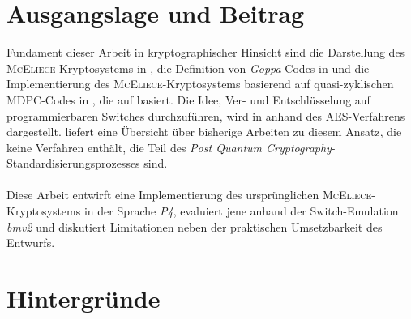 \documentclass[utf8, biblatex]{lni}
\begin{document}
\section{Ausgangslage und Beitrag}
Fundament dieser Arbeit in kryptographischer Hinsicht sind die Darstellung des \textsc{McEliece}-Kryptosystems in \cite{McEliece1978}, die Definition von \textit{Goppa}-Codes in \cite{Berlekamp1973} und die Implementierung des \textsc{McEliece}-Kryptosystems basierend auf quasi-zyklischen MDPC-Codes in \cite{Maurich2015}, die auf \cite{Misoczki2013} basiert. Die Idee, Ver- und Entschlüsselung auf programmierbaren Switches durchzuführen, wird in \cite{Chen2020} anhand des AES-Verfahrens dargestellt. \cite{AlSabeh2022} liefert eine Übersicht über bisherige Arbeiten zu diesem Ansatz, die keine Verfahren enthält, die Teil des \textit{Post Quantum Cryptography}-Standardisierungsprozesses sind. \\\\
Diese Arbeit entwirft eine Implementierung des ursprünglichen \textsc{McEliece}-Kryptosystems in der Sprache \textit{P4}, evaluiert jene anhand der Switch-Emulation \textit{bmv2} und diskutiert Limitationen neben der praktischen Umsetzbarkeit des Entwurfs.
\section{Hintergründe}
\end{document}
